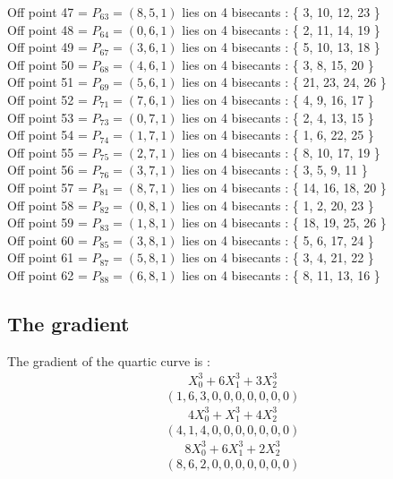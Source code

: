 \documentclass{article}
\begin{document}
{Off point 47 = $P_{63} = ( 8, 5, 1 )$ lies on 4 bisecants : \{ 3, 10, 12, 23 \}\\
Off point 48 = $P_{64} = ( 0, 6, 1 )$ lies on 4 bisecants : \{ 2, 11, 14, 19 \}\\
Off point 49 = $P_{67} = ( 3, 6, 1 )$ lies on 4 bisecants : \{ 5, 10, 13, 18 \}\\
Off point 50 = $P_{68} = ( 4, 6, 1 )$ lies on 4 bisecants : \{ 3, 8, 15, 20 \}\\
Off point 51 = $P_{69} = ( 5, 6, 1 )$ lies on 4 bisecants : \{ 21, 23, 24, 26 \}\\
Off point 52 = $P_{71} = ( 7, 6, 1 )$ lies on 4 bisecants : \{ 4, 9, 16, 17 \}\\
Off point 53 = $P_{73} = ( 0, 7, 1 )$ lies on 4 bisecants : \{ 2, 4, 13, 15 \}\\
Off point 54 = $P_{74} = ( 1, 7, 1 )$ lies on 4 bisecants : \{ 1, 6, 22, 25 \}\\
Off point 55 = $P_{75} = ( 2, 7, 1 )$ lies on 4 bisecants : \{ 8, 10, 17, 19 \}\\
Off point 56 = $P_{76} = ( 3, 7, 1 )$ lies on 4 bisecants : \{ 3, 5, 9, 11 \}\\
Off point 57 = $P_{81} = ( 8, 7, 1 )$ lies on 4 bisecants : \{ 14, 16, 18, 20 \}\\
Off point 58 = $P_{82} = ( 0, 8, 1 )$ lies on 4 bisecants : \{ 1, 2, 20, 23 \}\\
Off point 59 = $P_{83} = ( 1, 8, 1 )$ lies on 4 bisecants : \{ 18, 19, 25, 26 \}\\
Off point 60 = $P_{85} = ( 3, 8, 1 )$ lies on 4 bisecants : \{ 5, 6, 17, 24 \}\\
Off point 61 = $P_{87} = ( 5, 8, 1 )$ lies on 4 bisecants : \{ 3, 4, 21, 22 \}\\
Off point 62 = $P_{88} = ( 6, 8, 1 )$ lies on 4 bisecants : \{ 8, 11, 13, 16 \}\\
\subsection*{The gradient}
The gradient of the quartic curve  is :
$$
\begin{array}{c}
X_0^3 + 6X_1^3 + 3X_2^3\end{array}
$$
$$
( 1, 6, 3, 0, 0, 0, 0, 0, 0, 0 )$$
$$
\begin{array}{c}
4X_0^3 + X_1^3 + 4X_2^3\end{array}
$$
$$
( 4, 1, 4, 0, 0, 0, 0, 0, 0, 0 )$$
$$
\begin{array}{c}
8X_0^3 + 6X_1^3 + 2X_2^3\end{array}
$$
$$
( 8, 6, 2, 0, 0, 0, 0, 0, 0, 0 )$$


}
\end{document}
